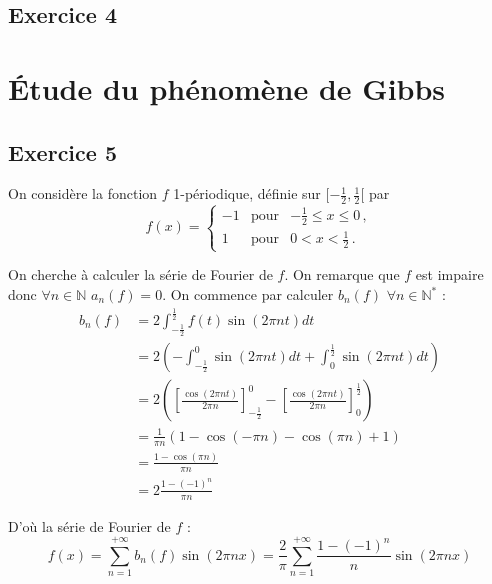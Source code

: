 \documentclass[a4paper,11pt]{article}
\begin{document}
\subsection*{Exercice 4}

\section{Étude du phénomène de Gibbs}

\subsection*{Exercice 5}
	On considère la fonction $f$ 1-périodique, définie sur $[-\frac{1}{2}, \frac{1}{2}[$ par
	\begin{equation*}
	f(x) = \left\{\begin{array}{lll}
	-1 & \text{pour} & -\frac{1}{2} \le x \le 0 \,,\\
	1 & \text{pour} & 0< x < \frac{1}{2} \,.
	\end{array}\right.
	\end{equation*}

	On cherche à calculer la série de Fourier de $f$. On remarque que $f$ est impaire donc $\forall n \in \mathbb{N} $ $a_{n}(f) = 0$.
	On commence par calculer $b_{n}(f)$ $\forall n \in \mathbb{N}^{*}$ :
	\begin{align*}
		b_{n}(f)
		& = 2 \int_{-\frac{1}{2}}^{\frac{1}{2}} f(t) \sin (2 \pi n t) dt \\
		& = 2 \left ( - \int_{-\frac{1}{2}}^{0} \sin (2 \pi n t) dt + \int_{0}^{\frac{1}{2}} \sin (2 \pi n t) dt \right ) \\
		& = 2 \left ( \left [ \frac{\cos ( 2 \pi n t)}{2 \pi n} \right ]_{-\frac{1}{2}}^{0} - \left [ \frac{\cos ( 2 \pi n t)}{2 \pi n} \right ]_{0}^{\frac{1}{2}} \right ) \\
		& = \frac{1}{\pi n} \left ( 1 - \cos (- \pi n) - \cos ( \pi n) + 1 \right ) \\
		& = \frac{1 - \cos (\pi n)}{\pi n} \\
		& = 2 \frac{1-(-1)^{n}}{\pi n}
	\end{align*}

	D'où la série de Fourier de $f$ :
	\begin{equation*}
		f(x) = \sum_{n=1}^{+ \infty} b_{n}(f) \sin (2 \pi n x) = \frac{2}{\pi} \sum_{n=1}^{+ \infty} \frac{1-(-1)^{n}}{n} \sin (2 \pi n x)
	\end{equation*}
\end{document}
